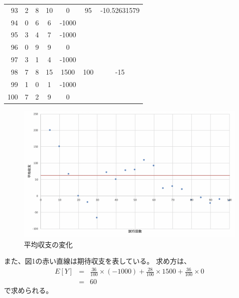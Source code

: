 \documentclass[12pt]{jarticle}
\begin{document}
\begin{table}
\begin{tabular}[h]{|r|c|c|c|c|c|c|}
        93       & 2             & 8             & 10           & 0     & 95       & -10.52631579 \\
        94       & 0             & 6             & 6            & -1000 &          &              \\
        95       & 3             & 4             & 7            & -1000 &          &              \\
        \hline
        96       & 0             & 9             & 9            & 0     &          &              \\
        97       & 3             & 1             & 4            & -1000 &          &              \\
        98       & 7             & 8             & 15           & 1500  & 100      & -15          \\
        99       & 1             & 0             & 1            & -1000 &          &              \\
        100      & 7             & 2             & 9            & 0     &          &              \\
        \hline
    \end{tabular}
\end{table}
\begin{figure}[h]
    \begin{center}
        \includegraphics[scale=0.8]{kadai4_graph1.png}
    \end{center}
    \caption{平均収支の変化}
    \label{fig1}
\end{figure}
\clearpage

また、図1の赤い直線は期待収支を表している。
求め方は、
\begin{eqnarray}
    E[Y] &=& \frac{36}{100}×(-1000) + \frac{28}{100}×1500 + \frac{36}{100}×0 \nonumber\\
    &=& 60
\end{eqnarray}
で求められる。
\end{document}
